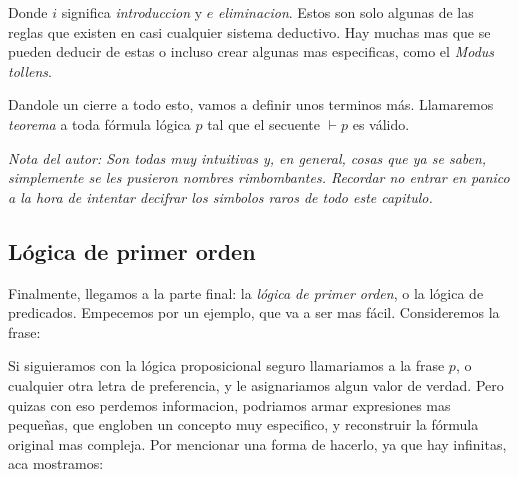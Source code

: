 \documentclass{article}
\begin{document}
\begin{center}
\end{center}

Donde $i$ significa \textit{introduccion} y $e$ \textit{eliminacion}. Estos son solo algunas de las reglas que existen en casi cualquier sistema deductivo. Hay muchas mas que se pueden deducir de estas o incluso crear algunas mas especificas, como el \textit{Modus tollens}.

Dandole un cierre a todo esto, vamos a definir unos terminos más. Llamaremos \textit{teorema} a toda fórmula lógica $p$ tal que el secuente $\vdash p$ es válido.

\small{ \textit{Nota del autor: Son todas muy intuitivas y, en general, cosas que ya se saben, simplemente se les pusieron nombres rimbombantes. Recordar no entrar en panico a la hora de intentar decifrar los simbolos raros de todo este capitulo.}}

\subsection{Lógica de primer orden}

Finalmente, llegamos a la parte final: la \textit{lógica de primer orden}, o la lógica de predicados. Empecemos por un ejemplo, que va a ser mas fácil. Consideremos la frase:


Si siguieramos con la lógica proposicional seguro llamariamos a la frase $p$, o cualquier otra letra de preferencia, y le asignariamos algun valor de verdad. Pero quizas con eso perdemos informacion, podriamos armar expresiones mas pequeñas, que engloben un concepto muy especifico, y reconstruir la fórmula original mas compleja. Por mencionar una forma de hacerlo, ya que hay infinitas, aca mostramos:
\end{document}
